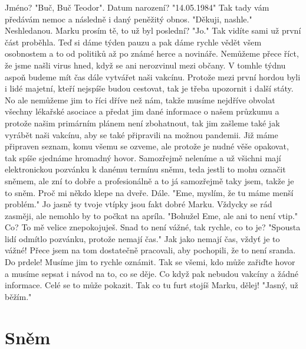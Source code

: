 Jméno? "Buč, Buč Teodor". Datum narození? "14.05.1984" Tak tady vám předávám nemoc a následně i daný peněžitý obnos. "Děkuji, nashle." Neshledanou. Marku prosím tě, to už byl poslední? "Jo." Tak vidíte sami už první část proběhla. Teď si dáme týden pauzu a pak dáme rychle vědět všem osobnostem a to od politiků až po známé herce a novináře. Nemůžeme přece říct, že jsme našli virus hned, když se ani nerozvinul mezi občany. V tomhle týdnu aspoň budeme mít čas dále vytvářet naši vakcínu. Protože mezi první hordou byli i lidé majetní, kteří nejspíše budou cestovat, tak je třeba upozornit i další státy. No ale nemůžeme jim to říci dříve než nám, takže musíme nejdříve obvolat všechny lékařské asociace a předat jim dané informace o našem průzkumu a protože našim primárním plánem není zbohatnout, tak jim zašleme také jak vyrábět naši vakcínu, aby se také připravili na možnou pandemii. Již máme připraven seznam, komu všemu se ozveme, ale protože je nudné věše opakovat, tak spíše sjednáme hromadný hovor. Samozřejmě neleníme a už všichni mají elektronickou pozvánku k danému termínu sněmu, teda jestli to mohu označit sněmem, ale zní to dobře a profesionálně a to já samozřejmě taky jsem, takže je to sněm. Proč mi někdo klepe na dveře. Dále. "Eme, myslím, že tu máme menší problém." Jo jasně ty tvoje vtípky jsou fakt dobré Marku. Vždycky se rád zasměji, ale nemohlo by to počkat na apríla. "Bohužel Eme, ale ani to není vtip." Co? To mě velice znepokojuješ. Snad to není vážné, tak rychle, co to je? "Spousta lidí odmítlo pozvánku, protože nemají čas." Jak jako nemají čas, vždyť je to vážné! Přece jsem na tom dostatečně pracovali, aby pochopili, že to není sranda. Do prdele! Musíme jim to rychle oznámit. Tak se všemi, kdo může zařiďte hovor a musíme sepsat i návod na to, co se děje. Co když pak nebudou vakcíny a žádné informace. Celé se to může pokazit. Tak co tu furt stojíš Marku, dělej! "Jasný, už běžím."

\section{Sněm}